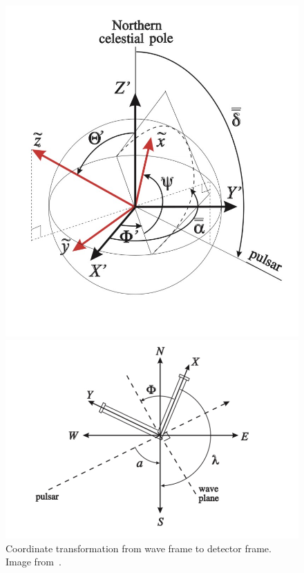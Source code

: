 \documentclass{ttuthes2007}
\begin{document}
\begin{figure}[h!]
  \centering
  \begin{minipage}{0.4\textwidth}
    \includegraphics[width=\textwidth]{figure/wavedetector.jpg}
  \end{minipage}
  \hfill
  \begin{minipage}{0.6\textwidth}
    \includegraphics[width=\textwidth]{figure/wavecelestial.jpg}
  \end{minipage}
  \caption{Coordinate transformation from wave frame to detector frame. Image
   from~\cite{1996A&A...312..675B}.}
  \label{fig:Wavetodetector}
\end{figure}
\end{document}
